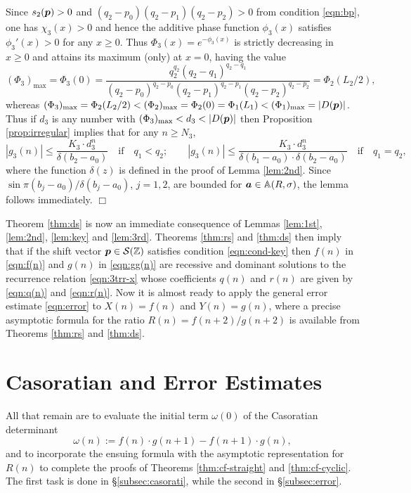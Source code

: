 \documentclass[a4paper,12pt]{article}
\theoremstyle{plain}
\def\A{\mathbb{A}}
\def\Z{\mathbb{Z}}
\def\cS{\mathcal{S}}
\def\ba{\mbox{\boldmath $a$}}
\def\bp{\mbox{\boldmath $p$}}
\begin{document}
Since $s_2(\bp) > 0$ and $(q_2-p_0)(q_2-p_1)(q_2-p_2) > 0$ from 
condition \eqref{eqn:bp}, one has $\chi_3(x) > 0$ and hence the additive phase 
function $\phi_3(x)$ satisfies $\phi_3'(x) > 0$ for any $x \ge 0$.     
Thus $\Phi_3(x) = e^{-\phi_3(x)}$ is strictly decreasing in $x \ge 0$ and 
attains its maximum (only) at $x = 0$, having the value 
\[
(\Phi_3)_{\mathrm{max}} = \Phi_3(0) = 
\frac{q_2^{q_2} (q_2-q_1)^{q_2-q_1}}{(q_2-p_0)^{q_2-p_0} 
(q_2-p_1)^{q_2-p_1} (q_2-p_2)^{q_2-p_2}} = \Phi_2(L_2/2),        
\]
whereas $(\Phi_3)_{\mathrm{max}} = \Phi_2(L_2/2) < (\Phi_2)_{\mathrm{max}} 
= \Phi_2(0) = \Phi_1(L_1) < (\Phi_1)_{\mathrm{max}} = |D(\bp)|$. 
Thus if $d_3$ is any number with $(\Phi_3)_{\mathrm{max}} < d_3 < |D(\bp)|$ 
then Proposition \ref{prop:irregular} implies that for any $n \ge N_3$, 
\[
|g_3(n)| \le \frac{K_3 \cdot d_3^n}{\delta(b_2-a_0)} \quad \mbox{if} \quad q_1 < q_2; 
\qquad 
|g_3(n)| \le \frac{K_3 \cdot d_3^n}{\delta(b_1-a_0) \cdot \delta(b_2-a_0)} 
\quad \mbox{if} \quad q_1 = q_2,   
\]
where the function $\delta(z)$ is defined in the proof of Lemma \ref{lem:2nd}. 
Since $\sin \pi(b_j-a_0) / \delta(b_j-a_0)$, $j = 1, 2$, are bounded 
for $\ba \in \A(R, \sigma)$, the lemma follows immediately.  
\hfill $\Box$ \par\medskip 
Theorem \ref{thm:ds} is now an immediate consequence of Lemmas \ref{lem:1st}, 
\ref{lem:2nd}, \ref{lem:key} and \ref{lem:3rd}. 
Theorems \ref{thm:rs} and \ref{thm:ds} then imply that  if  the shift vector 
$\bp \in \cS(\Z)$ satisfies condition \eqref{eqn:cond-key} then $f(n)$ in 
\eqref{eqn:f(n)} and $g(n)$ in \eqref{eqn:gg(n)} are recessive and dominant 
solutions to the recurrence relation \eqref{eqn:3trr-x} whose coefficients 
$q(n)$ and $r(n)$ are given by \eqref{eqn:q(n)} and \eqref{eqn:r(n)}.  
Now it is almost ready to apply the general error estimate \eqref{eqn:error} 
to $X(n) = f(n)$ and $Y(n) = g(n)$, where a precise asymptotic formula for the 
ratio $R(n) = f(n+2)/g(n+2)$ is available from Theorems \ref{thm:rs} and \ref{thm:ds}. 
\section{Casoratian and Error Estimates} \label{sec:casorati}
All that remain are to evaluate the initial term $\omega(0)$ of the Casoratian 
determinant 
\[
\omega(n) := f(n) \cdot g(n+1) - f(n+1) \cdot g(n), 
\]       
and to incorporate the ensuing formula with the asymptotic representation 
for $R(n)$ to complete the proofs of Theorems \ref{thm:cf-straight} and 
\ref{thm:cf-cyclic}. 
The first task is done in \S\ref{subsec:casorati}, while the second in 
\S\ref{subsec:error}. 
\end{document}
